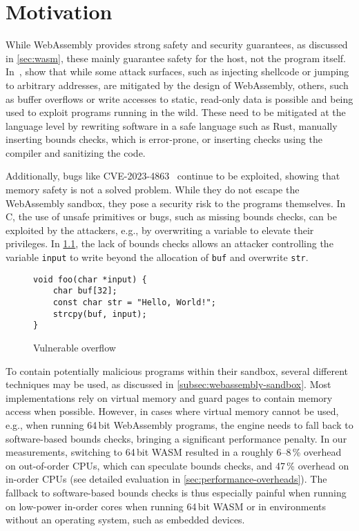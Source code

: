 \chapter{Motivation}
\label{ch:motivation}

While WebAssembly provides strong safety and security guarantees, as discussed in \cref{sec:wasm}, these mainly guarantee safety for the host, not the program itself.
In~\cite{lehmann2020everything}, \citeauthor*{lehmann2020everything} show that while some attack surfaces, such as injecting shellcode or jumping to arbitrary addresses, are mitigated by the design of WebAssembly, others, such as buffer overflows or write accesses to static, read-only data is possible and being used to exploit programs running in the wild.
These need to be mitigated at the language level by rewriting software in a safe language such as Rust, manually inserting bounds checks, which is error-prone, or inserting checks using the compiler and sanitizing the code.

Additionally, bugs like {CVE-2023-4863}~\cite{CVE-2023-4863} continue to be exploited, showing that memory safety is not a solved problem.
While they do not escape the WebAssembly sandbox, they pose a security risk to the programs themselves.
In C, the use of unsafe primitives or bugs, such as missing bounds checks, can be exploited by the attackers, e.g., by overwriting a variable to elevate their privileges.
In \cref{fig:vulnerable-overflow}, the lack of bounds checks allows an attacker controlling the variable \texttt{input} to write beyond the allocation of \texttt{buf} and overwrite \texttt{str}.

\begin{figure}[h]
    \centering
    \begin{lstlisting}[frame=h,style=customc,label={lst:vulnerable-overflow}]
void foo(char *input) {
    char buf[32];
    const char str = "Hello, World!";
    strcpy(buf, input);
}
    \end{lstlisting}
    \caption{Vulnerable overflow}
    \label{fig:vulnerable-overflow}
\end{figure}

To contain potentially malicious programs within their sandbox, several different techniques may be used, as discussed in \cref{subsec:webassembly-sandbox}.
Most implementations rely on virtual memory and guard pages to contain memory access when possible.
However, in cases where virtual memory cannot be used, e.g., when running 64\,bit WebAssembly programs, the engine needs to fall back to software-based bounds checks, bringing a significant performance penalty.
In our measurements, switching to 64\,bit \ac{WASM} resulted in a roughly 6--8\,\% overhead on out-of-order CPUs, which can speculate bounds checks, and 47\,\% overhead on in-order CPUs (see detailed evaluation in \cref{sec:performance-overheads}).
The fallback to software-based bounds checks is thus especially painful when running on low-power in-order cores when running 64\,bit \ac{WASM} or in environments without an operating system, such as embedded devices.

